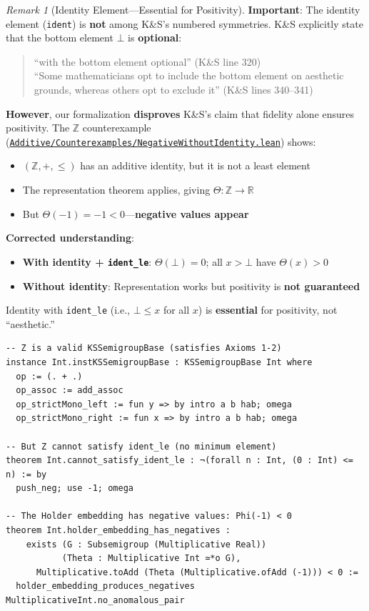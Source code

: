 \documentclass[11pt]{article}
\theoremstyle{definition}
\theoremstyle{remark}
\newtheorem{remark}[theorem]{Remark}
\begin{document}
\begin{remark}[Identity Element---Essential for Positivity]
\textbf{Important}: The identity element (\texttt{ident}) is \textbf{not} among K\&S's numbered symmetries.
K\&S explicitly state that the bottom element $\bot$ is \textbf{optional}:
\begin{quote}
``with the bottom element optional'' (K\&S line 320)\\
``Some mathematicians opt to include the bottom element on aesthetic grounds, whereas others opt to exclude it'' (K\&S lines 340--341)
\end{quote}

\textbf{However}, our formalization \textbf{disproves} K\&S's claim that fidelity alone ensures positivity.
The $\mathbb{Z}$ counterexample (\href{https://github.com/zariuq/ks-foundations-of-inference/blob/main/KnuthSkilling/Additive/Counterexamples/NegativeWithoutIdentity.lean}{\texttt{Additive/Counterexamples/NegativeWithoutIdentity.lean}}) shows:
\begin{itemize}
\item $(\mathbb{Z}, +, \leq)$ has an additive identity, but it is not a least element
\item The representation theorem applies, giving $\Theta : \mathbb{Z} \to \mathbb{R}$
\item But $\Theta(-1) = -1 < 0$---\textbf{negative values appear}
\end{itemize}

\textbf{Corrected understanding}:
\begin{itemize}
\item \textbf{With identity + \texttt{ident\_le}}: $\Theta(\bot) = 0$; all $x > \bot$ have $\Theta(x) > 0$
\item \textbf{Without identity}: Representation works but positivity is \textbf{not guaranteed}
\end{itemize}

Identity with \texttt{ident\_le} (i.e., $\bot \leq x$ for all $x$) is \textbf{essential} for positivity, not ``aesthetic.''

\begin{lstlisting}[caption={$\mathbb{Z}$ counterexample: representation works but positivity fails}]
-- Z is a valid KSSemigroupBase (satisfies Axioms 1-2)
instance Int.instKSSemigroupBase : KSSemigroupBase Int where
  op := (. + .)
  op_assoc := add_assoc
  op_strictMono_left := fun y => by intro a b hab; omega
  op_strictMono_right := fun x => by intro a b hab; omega

-- But Z cannot satisfy ident_le (no minimum element)
theorem Int.cannot_satisfy_ident_le : ¬(forall n : Int, (0 : Int) <= n) := by
  push_neg; use -1; omega

-- The Holder embedding has negative values: Phi(-1) < 0
theorem Int.holder_embedding_has_negatives :
    exists (G : Subsemigroup (Multiplicative Real))
           (Theta : Multiplicative Int ≃*o G),
      Multiplicative.toAdd (Theta (Multiplicative.ofAdd (-1))) < 0 :=
  holder_embedding_produces_negatives MultiplicativeInt.no_anomalous_pair
\end{lstlisting}
\end{remark}
\end{document}
